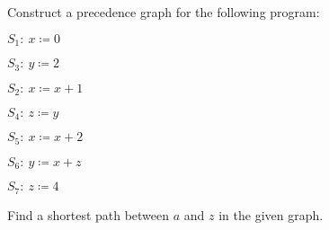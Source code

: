 \documentclass[a4paper,12pt]{article}
\begin{document}
\begin{tasks}
    Construct a precedence graph for the following program:
    \par\hspace{2em}$S_1 :~ x \coloneqq 0$
    \par\hspace{2em}$S_3 :~ y \coloneqq 2$
    \par\hspace{2em}$S_2 :~ x \coloneqq x + 1$
    \par\hspace{2em}$S_4 :~ z \coloneqq y$
    \par\hspace{2em}$S_5 :~ x \coloneqq x + 2$
    \par\hspace{2em}$S_6 :~ y \coloneqq x + z$
    \par\hspace{2em}$S_7 :~ z \coloneqq 4$


    \item\label{task:weighted-graph} Find a shortest path between $a$ and $z$ in the given graph.


\end{tasks}
\end{document}
